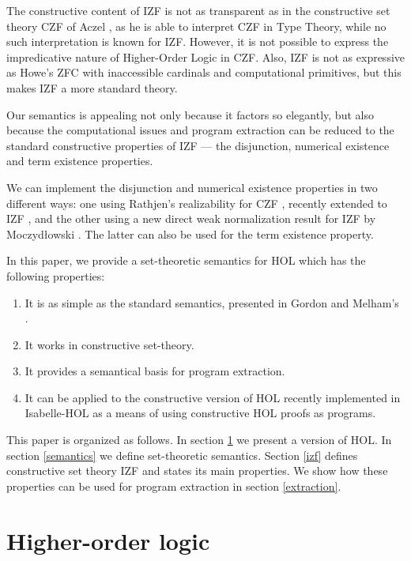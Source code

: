 \documentclass{LMCS}
\begin{document}
The constructive content of IZF is not as transparent as in the constructive
set theory CZF of Aczel \cite{Acz78}, as he is able to
interpret CZF in Type Theory, while no such interpretation is known for
IZF. However, it is not possible to express the impredicative nature of
Higher-Order Logic in CZF.  Also, IZF is not as expressive as Howe's ZFC
\cite{Howe96,Howe98a} with inaccessible cardinals and computational
primitives, but this makes IZF a more standard theory.

Our semantics is appealing not only because it factors so elegantly, but
also because the computational issues and program extraction can be reduced
to the standard constructive properties of IZF --- the disjunction,
numerical existence and term existence properties. 

We can implement the disjunction and numerical existence properties in two
different ways: one using Rathjen's realizability for CZF \cite{Rat05},
recently extended to IZF \cite{rathjen2006}, and the other using a new direct weak normalization result for IZF
by Moczyd\l owski \cite{jacsl2006,jatrinac2006}. The latter can also be used for the term existence
property.

In this paper, we provide a set-theoretic semantics for HOL which has the 
following properties: 
 
\begin{enumerate}[] 
\item It is as simple as the standard semantics, presented in Gordon and
Melham's \cite{GM93}.
\item It works in constructive set-theory. 
\item It provides a semantical basis for program extraction.
\item It can be applied to the constructive version of HOL recently
implemented in Isabelle-HOL as a means of using constructive HOL proofs
as programs.
\end{enumerate} 
 
This paper is organized as follows. In section \ref{hol} we present a
version of HOL. In section \ref{semantics} we define set-theoretic
semantics.  Section \ref{izf} defines constructive set theory IZF and states
its main properties. We show how these properties can be used for program
extraction in section \ref{extraction}. 
 
\section{Higher-order logic}\label{hol}
\end{document}
